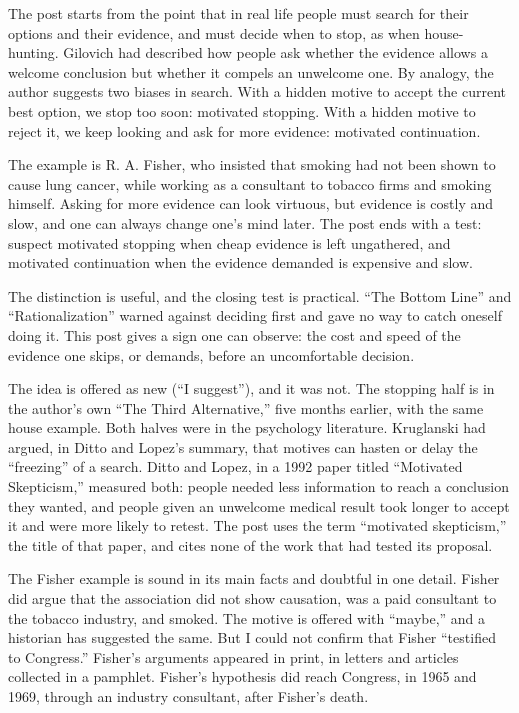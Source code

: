 \begin{afterword}
\summaryhead

The post starts from the point that in real life people must search for their options and their evidence, and must decide when to stop, as when house-hunting. Gilovich had described how people ask whether the evidence allows a welcome conclusion but whether it compels an unwelcome one. By analogy, the author suggests two biases in search. With a hidden motive to accept the current best option, we stop too soon: motivated stopping. With a hidden motive to reject it, we keep looking and ask for more evidence: motivated continuation.

The example is R. A. Fisher, who insisted that smoking had not been shown to cause lung cancer, while working as a consultant to tobacco firms and smoking himself. Asking for more evidence can look virtuous, but evidence is costly and slow, and one can always change one's mind later. The post ends with a test: suspect motivated stopping when cheap evidence is left ungathered, and motivated continuation when the evidence demanded is expensive and slow.

\responsehead

The distinction is useful, and the closing test is practical. ``The Bottom Line'' and ``Rationalization'' warned against deciding first and gave no way to catch oneself doing it. This post gives a sign one can observe: the cost and speed of the evidence one skips, or demands, before an uncomfortable decision.

The idea is offered as new (``I suggest''), and it was not. The stopping half is in the author's own ``The Third Alternative,'' five months earlier, with the same house example. Both halves were in the psychology literature. Kruglanski had argued, in Ditto and Lopez's summary, that motives can hasten or delay the ``freezing'' of a search. Ditto and Lopez, in a 1992 paper titled ``Motivated Skepticism,'' measured both: people needed less information to reach a conclusion they wanted, and people given an unwelcome medical result took longer to accept it and were more likely to retest. The post uses the term ``motivated skepticism,'' the title of that paper, and cites none of the work that had tested its proposal.

The Fisher example is sound in its main facts and doubtful in one detail. Fisher did argue that the association did not show causation, was a paid consultant to the tobacco industry, and smoked. The motive is offered with ``maybe,'' and a historian has suggested the same. But I could not confirm that Fisher ``testified to Congress.'' Fisher's arguments appeared in print, in letters and articles collected in a pamphlet. Fisher's hypothesis did reach Congress, in 1965 and 1969, through an industry consultant, after Fisher's death.


\end{afterword}
